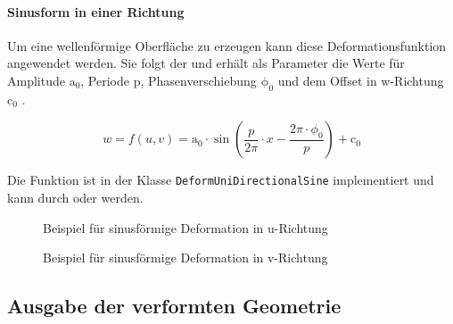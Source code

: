 \paragraph{Sinusform in einer Richtung} Um eine wellenförmige Oberfläche zu erzeugen kann diese Deformationsfunktion angewendet werden. Sie folgt der  und erhält als Parameter die Werte für Amplitude $\mathrm{a_0}$, Periode $\mathrm{p}$, Phasenverschiebung $\mathrm{\phi_0}$ und dem Offset in w-Richtung $\mathrm{c_0}$ . 

\begin{equation}\label{eq:sine}
w=f(u,v) = \mathrm{a_0} \cdot \sin\left(\frac{p}{2\pi}\cdot x-\frac{2\pi \cdot \phi_0}{p}\right)+\mathrm{c_0}
\end{equation} 

Die Funktion ist in der Klasse \verb|DeformUniDirectionalSine| implementiert und kann durch  oder  werden.

\begin{figure}[h]
	\centering
	\caption{Beispiel für sinusförmige Deformation in u-Richtung}
	\label{fig:sineu}
\end{figure} 

\begin{figure}[h]
	\centering
	\caption{Beispiel für sinusförmige Deformation in v-Richtung}
	\label{fig:sinev}
\end{figure} 

\clearpage
\subsection{Ausgabe der verformten Geometrie}

